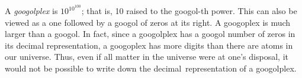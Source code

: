 \documentclass{article}
\begin{document}
A \emph{googolplex} is $10^{10^{100}}$; that is, 10 raised to the googol-th power. This can also be viewed as a one followed by a googol of zeros at its right. A googoplex is much larger than a googol. In fact, since a googolplex has 
a googol number of zeros in its decimal representation, a googoplex has more digits than there are atoms in our universe. Thus, even if all matter in the universe were at one's disposal, it would not be possible to write down the decimal~representation of a googolplex.
\end{document}
